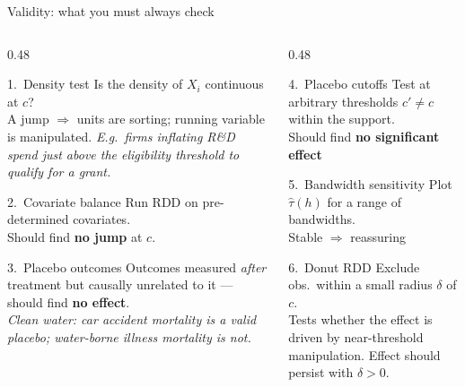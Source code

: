 \documentclass[aspectratio=169, 10pt]{beamer}
\begin{document}
\begin{frame}[shrink=15]{Validity: what you must always check}

  \begin{columns}[T]
    \begin{column}{0.48\textwidth}
      \begin{block}{1.\ Density test}
        Is the density of $X_i$ continuous at $c$? \\
        A jump $\Rightarrow$ units are sorting; running variable is
        manipulated. \emph{E.g.\ firms inflating R\&D spend just above the
        eligibility threshold to qualify for a grant.}
      \end{block}

      \smallskip
      \begin{block}{2.\ Covariate balance}
        Run RDD on pre-determined covariates.\\
        Should find \textbf{no jump} at $c$.
      \end{block}

      \smallskip
      \begin{block}{3.\ Placebo outcomes \citep{cattaneo2019}}
        \small Outcomes measured \emph{after} treatment but causally
        unrelated to it — should find \textbf{no effect}.\\
        \emph{Clean water: car accident mortality is a valid placebo;
        water-borne illness mortality is not.}
      \end{block}
    \end{column}
    \begin{column}{0.48\textwidth}
      \begin{block}{4.\ Placebo cutoffs}
        Test at arbitrary thresholds $c' \neq c$ within the support.\\
        Should find \textbf{no significant effect}
      \end{block}

      \smallskip
      \begin{block}{5.\ Bandwidth sensitivity}
        Plot $\hat\tau(h)$ for a range of bandwidths.\\
        Stable $\Rightarrow$ reassuring
      \end{block}

      \smallskip
      \begin{block}{6.\ Donut RDD}
        Exclude obs.\ within a small radius $\delta$ of $c$.\\
        Tests whether the effect is driven by near-threshold
        manipulation. Effect should persist with $\delta>0$.
      \end{block}
    \end{column}
  \end{columns}

\end{frame}
\end{document}
